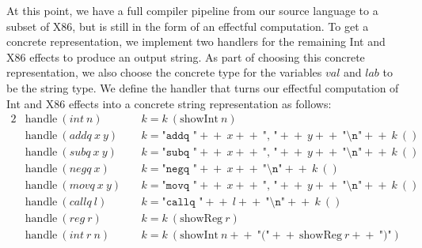 \documentclass[a4paper,UKenglish,cleveref, autoref, thm-restate, anonymous]{oasics-v2021}
\newcommand\append{+\!\!\!\!+~}
\begin{document}
At this point, we have a full compiler pipeline from our source language to a subset of X86, but is still in the form of an effectful computation.
To get a concrete representation, we implement two handlers for the remaining Int and X86 effects to produce an output string.
As part of choosing this concrete representation, we also choose the concrete type for the variables $\mathit{val}$ and $\mathit{lab}$ to be the string type.
We define the handler that turns our effectful computation of Int and X86 effects into a concrete string representation as follows:
\begin{alignat*}{2}
  & \mathrm{handle}~(\mathit{int}~n)~&& k = k~(\mathrm{showInt}~n) \\
  & \mathrm{handle}~(\mathit{addq}~x~y)~&& k = \texttt{"addq "} \append x \append \texttt{", "} \append y \append \texttt{"\textbackslash{}n"} \append k~() \\
  & \mathrm{handle}~(\mathit{subq}~x~y)~&& k = \texttt{"subq "} \append x \append \texttt{", "} \append y \append \texttt{"\textbackslash{}n"} \append k~() \\
  & \mathrm{handle}~(\mathit{negq}~x)~&& k = \texttt{"negq "} \append x \append \texttt{"\textbackslash{}n"} \append k~() \\
  & \mathrm{handle}~(\mathit{movq}~x~y)~&& k = \texttt{"movq "} \append x \append \texttt{", "} \append y \append \texttt{"\textbackslash{}n"} \append k~() \\
  & \mathrm{handle}~(\mathit{callq}~l)~&& k = \texttt{"callq "} \append l \append \texttt{"\textbackslash{}n"} \append k~() \\
  & \mathrm{handle}~(\mathit{reg}~r)~&& k = k~(\mathrm{showReg}~r) \\
  & \mathrm{handle}~(\mathit{int}~r~n)~&& k = k~(\mathrm{showInt}~n \append \texttt{"("} \append \mathrm{showReg}~r \append \texttt{")"})
\end{alignat*}
\end{document}
